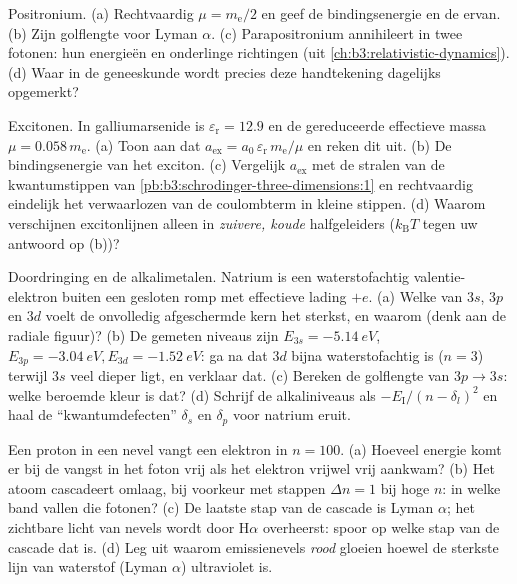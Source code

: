 \begin{exercise}[$\star\star$]\label{exo:b3:hydrogen-atom:6}
Positronium. (a) Rechtvaardig $\mu = m_{\text{e}}/2$ en geef de
bindingsenergie en de  ervan. (b) Zijn golflengte voor Lyman
$\alpha$. (c) Parapositronium annihileert in twee fotonen: hun energieën
en onderlinge richtingen (uit \cref{ch:b3:relativistic-dynamics}). (d)
Waar in de geneeskunde wordt precies deze handtekening dagelijks
opgemerkt?
\end{exercise}

\begin{exercise}[$\star\star$]\label{exo:b3:hydrogen-atom:7}
Excitonen. In galliumarsenide is $\varepsilon_{\text{r}} = 12.9$ en de
gereduceerde effectieve massa $\mu = 0.058\,m_{\text{e}}$. (a) Toon aan
dat $a_{\text{ex}} = a_0\,\varepsilon_{\text{r}}\,m_{\text{e}}/\mu$ en
reken dit uit. (b) De bindingsenergie van het exciton. (c) Vergelijk
$a_{\text{ex}}$ met de stralen van de kwantumstippen van
\cref{pb:b3:schrodinger-three-dimensions:1} en rechtvaardig eindelijk het
verwaarlozen van de coulombterm in kleine stippen. (d) Waarom verschijnen
excitonlijnen alleen in \emph{zuivere, koude} halfgeleiders
($k_{\text{B}}T$ tegen uw antwoord op (b))?
\end{exercise}

\begin{exercise}[$\star\star$]\label{exo:b3:hydrogen-atom:8}
Doordringing en de alkalimetalen. Natrium is een waterstofachtig
valentie-elektron buiten een gesloten romp met effectieve lading $+e$.
(a) Welke van $3s$, $3p$ en $3d$ voelt de onvolledig afgeschermde kern het
sterkst, en waarom (denk aan de radiale figuur)? (b) De gemeten niveaus
zijn $E_{3s} = \qty{-5.14}{eV}$, $E_{3p} = \qty{-3.04}{eV},
E_{3d} = \qty{-1.52}{eV}$: ga na dat $3d$ bijna waterstofachtig is ($n = 3$) terwijl $3s$ veel dieper ligt, en verklaar dat. (c) Bereken de
golflengte van $3p \to 3s$: welke beroemde kleur is dat? (d) Schrijf de
alkaliniveaus als $-E_{\text{I}}/(n - \delta_l)^2$ en haal de
``kwantumdefecten'' $\delta_s$ en $\delta_p$ voor natrium eruit.
\end{exercise}

\begin{exercise}[$\star\star$]\label{exo:b3:hydrogen-atom:9}
Een proton in een nevel vangt een elektron in $n = 100$. (a) Hoeveel
energie komt er bij de vangst in het foton vrij als het elektron vrijwel
vrij aankwam? (b) Het atoom cascadeert omlaag, bij voorkeur met
stappen $\Delta n = 1$ bij hoge $n$: in welke band vallen die fotonen? (c) De
laatste stap van de cascade is Lyman $\alpha$; het zichtbare licht van
nevels wordt door H$\alpha$ overheerst: spoor op welke stap van de cascade
dat is. (d) Leg uit waarom emissienevels \emph{rood} gloeien hoewel de
sterkste lijn van waterstof (Lyman $\alpha$) ultraviolet is.
\end{exercise}

